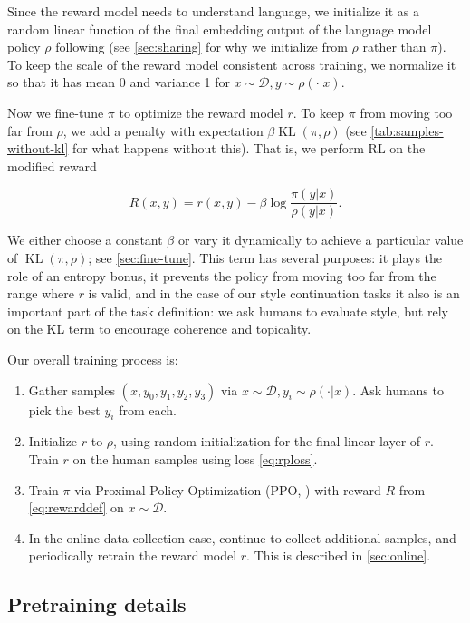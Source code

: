 Since the reward model needs to understand language, we initialize it as a random linear function of the final embedding output of the language model policy $\rho$
following \citet{radford2018improving} (see \ref{sec:sharing} for why we initialize from $\rho$ rather than $\pi$).
To keep the scale of the reward model consistent across training, we normalize it so that it has mean 0 and variance 1 for $x \sim \mathcal{D}, y \sim \rho(\cdot|x)$.

Now we fine-tune $\pi$ to optimize the reward model $r$. To keep $\pi$ from moving too far from $\rho$,
we add a penalty with expectation $\beta \operatorname{KL}(\pi,\rho)$ (see \ref{tab:samples-without-kl} for what happens without this). That is, we perform RL on the modified reward

\begin{equation}\label{eq:rewarddef}
R(x, y) = r(x, y) - \beta \log \frac {\pi(y|x)}{\rho(y|x)}.
\end{equation}

We either choose a constant $\beta$ or vary it dynamically to achieve a particular value of $\operatorname{KL}(\pi,\rho)$; see \ref{sec:fine-tune}.
This term has several purposes: it plays the role of an entropy bonus, it prevents the policy from moving too far from the range where $r$ is valid, and in the case of our style continuation tasks it also is an important part of the task definition: we ask humans to evaluate style, but rely on the KL term to encourage coherence and topicality.

Our overall training process is:

\begin{enumerate}
\item Gather samples $(x,y_0,y_1,y_2,y_3)$ via $x \sim \mathcal{D}, y_i \sim \rho(\cdot | x)$.  Ask humans to pick the best $y_i$ from each.
\item Initialize $r$ to $\rho$, using random initialization for the final linear layer of $r$.  Train $r$ on the human samples using loss \ref{eq:rploss}.
\item Train $\pi$ via Proximal Policy Optimization (PPO, \citet{schulman2017proximal}) with reward $R$ from \ref{eq:rewarddef}
on $x \sim \mathcal{D}$.
\item In the online data collection case, continue to collect additional samples, and periodically retrain the reward model $r$. This is described in \ref{sec:online}.
\end{enumerate}

\subsection{Pretraining details \label{sec:pretrain}}

